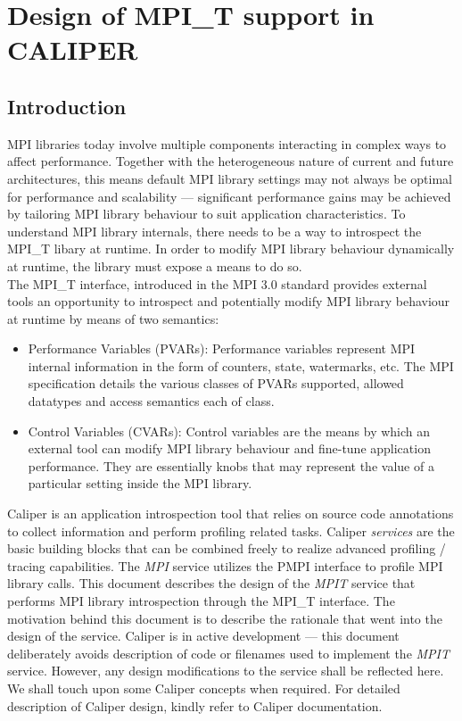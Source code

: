 \chapter{Design of MPI\_T support in CALIPER}

\section{Introduction}
MPI libraries today involve multiple components interacting in complex ways to affect performance. Together with the heterogeneous nature of current and future architectures, this means default MPI library settings may not always be optimal for performance and scalability --- significant performance gains may be achieved by tailoring MPI library behaviour to suit application characteristics. To understand MPI library internals, there needs to be a way to introspect the MPI\_T libary at runtime. In order to modify MPI library behaviour dynamically at runtime, the library must expose a means to do so. \\
The MPI\_T interface, introduced in the MPI 3.0 standard provides external tools an opportunity to introspect and potentially modify MPI library behaviour at runtime by means of two semantics:
\begin{itemize}
	\item Performance Variables (PVARs): Performance variables represent MPI internal information in the form of counters, state, watermarks, etc. The MPI specification details the various classes of PVARs supported, allowed datatypes and access semantics each of class. 
	\item Control Variables (CVARs): Control variables are the means by which an external tool can modify MPI library behaviour and fine-tune application performance. They are essentially knobs that may represent the value of a particular setting inside the MPI library.
\end{itemize}
Caliper is an application introspection tool that relies on source code annotations to collect information and perform profiling related tasks. Caliper \emph{services} are the basic building blocks that can be combined freely to realize advanced profiling / tracing capabilities. The \emph{MPI} service utilizes the PMPI interface to profile MPI library calls. This document describes the design of the \emph{MPIT} service that performs MPI library introspection through the MPI\_T interface. The motivation behind this document is to describe the rationale that went into the design of the service. Caliper is in active development --- this document deliberately avoids description of code or filenames used to implement the \emph{MPIT} service. However, any design modifications to the service shall be reflected here.\\
We shall touch upon some Caliper concepts when required. For detailed description of Caliper design, kindly refer to Caliper documentation.

